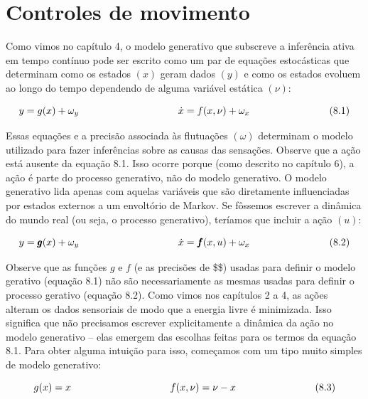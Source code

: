 \documentclass[
  12pt,
]{book}
\begin{document}
\hypertarget{controles-de-movimento}{%
\section{Controles de movimento}\label{controles-de-movimento}}

Como vimos no capítulo 4, o modelo generativo que subscreve a inferência ativa em tempo contínuo pode ser escrito como um par de equações estocásticas que determinam como os estados \((x)\) geram dados \((y)\) e como os estados evoluem ao longo do tempo dependendo de alguma variável estática \((\nu)\):

\[\begin{equation} 
y=g(x)+\omega_y \qquad\qquad\qquad\qquad\quad\quad\quad  \\ 
\dot x = f(x,\nu) + \omega_x \qquad\qquad\qquad\qquad (8.1)
\end{equation}\]

Essas equações e a precisão associada às flutuações \((\omega)\) determinam o modelo utilizado para fazer inferências sobre as causas das sensações.
Observe que a ação está ausente da equação 8.1. Isso ocorre porque (como descrito no capítulo 6), a ação é parte do processo generativo, não do modelo generativo. O modelo generativo lida apenas com aquelas variáveis que são diretamente influenciadas por estados externos a um envoltório de Markov. Se fôssemos escrever a dinâmica do mundo real (ou seja, o processo generativo), teríamos que incluir a ação \((u)\):

\[\begin{equation} 
y=\pmb g(x)+\omega_y \qquad\qquad\qquad\qquad\quad\quad\quad  \\ 
\dot x =\pmb f(x,u) + \omega_x \qquad\qquad\qquad\qquad (8.2)
\end{equation}\]

Observe que as funções \(g\) e \(f\) (e as precisões de \$\omega \$) usadas para definir o modelo gerativo (equação 8.1) não são necessariamente as mesmas usadas para definir o processo gerativo (equação 8.2). Como vimos nos capítulos 2 a 4, as ações alteram os dados sensoriais de modo que a energia livre é minimizada. Isso significa que não precisamos escrever explicitamente a dinâmica da ação no modelo generativo -- elas emergem das escolhas feitas para os termos da equação 8.1. Para obter alguma intuição para isso, começamos com um tipo muito simples de modelo generativo:

\[\begin{equation} 
g(x) = x \qquad\qquad\qquad\qquad\quad\quad\quad  \\ 
f(x,\nu) = \nu - x \qquad\qquad\qquad\qquad (8.3)
\end{equation}\]
\end{document}
